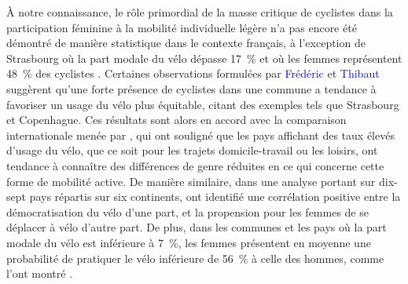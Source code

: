 \begin{refsegment}
À notre connaissance, le rôle primordial de la masse critique de cyclistes dans la participation féminine à la mobilité individuelle légère n'a pas encore été démontré de manière statistique dans le contexte français, à l'exception de Strasbourg où la part modale du vélo dépasse 17~\% et où les femmes représentent 48~\% des cyclistes \textcolor{blue}{\autocite[42]{certu_usagers_2013}}. Certaines observations formulées par \textcolor{blue}{Frédéric} \textcolor{blue}{\textcite[187]{heran_retour_2015}} et \textcolor{blue}{Thibaut} \textcolor{blue}{\textcite{schepman_pourquoi_2014}} suggèrent qu'une forte présence de cyclistes dans une commune a tendance à favoriser un usage du vélo plus équitable, citant des exemples tels que Strasbourg et Copenhague. Ces résultats sont alors en accord avec la comparaison internationale menée par \textcolor{blue}{\textcite[63]{garrard_revolutions_2006}}, qui ont souligné que les pays affichant des taux élevés d'usage du vélo, que ce soit pour les trajets domicile-travail ou les loisirs, ont tendance à connaître des différences de genre réduites en ce qui concerne cette forme de mobilité active. De manière similaire, dans une analyse portant sur dix-sept pays répartis sur six continents, \textcolor{blue}{\textcite[70]{goel_cycling_2022}} ont identifié une corrélation positive entre la démocratisation du vélo d'une part, et la propension pour les femmes de se déplacer à vélo d'autre part. De plus, dans les communes et les pays où la part modale du vélo est inférieure à 7~\%, les femmes présentent en moyenne une probabilité de pratiquer le vélo inférieure de 56~\% à celle des hommes, comme l'ont montré \textcolor{blue}{\textcite[70]{goel_cycling_2022}}.%


\end{refsegment}
